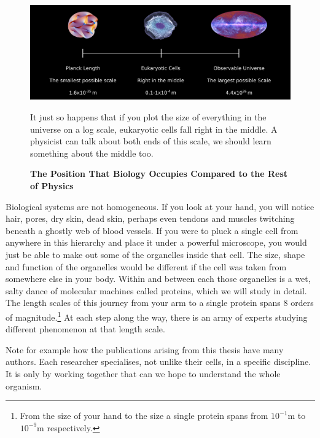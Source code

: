 \begin{figure}
	\begin{center}
		\includegraphics[width=1.0\textwidth]{figures/scales.png}
	\end{center}
	\captionsetup{singlelinecheck = false, justification=raggedright}
	\caption[The Position That Biology Occupies Compared to the Rest of Physics] {\textbf{The Position That Biology Occupies Compared to the Rest of Physics}}{It just so happens that if you plot the size of everything  in the universe on a log scale, eukaryotic cells fall right in the middle. A physicist can talk about both ends of this scale, we should learn something about the middle too.}
	\label{length_scales}
\end{figure}

Biological systems are not homogeneous. If you look at your hand, you will notice hair, pores, dry skin, dead skin, perhaps even tendons and muscles twitching beneath a ghostly web of blood vessels. If you were to pluck a single cell from anywhere in this hierarchy and place it under a powerful microscope, you would just be able to make out some of the organelles inside that cell. The size, shape and function of the organelles would be different if the cell was taken from somewhere else in your body. Within and between each those organelles is a wet, salty dance of molecular machines called proteins, which we will study in detail. The length scales of this journey from your arm to a single protein spans 8 orders of magnitude.\footnote{ From the size of your hand to the size a single protein spans from $10^{-1}$m  to $10^{-9}$m respectively.} At each step along the way, there is an army of experts studying different phenomenon at that length scale. 

Note for example how the publications arising from this thesis have many authors. Each researcher specialises, not unlike their cells, in a specific discipline. It is only by working together that can we hope to understand the whole organism.


